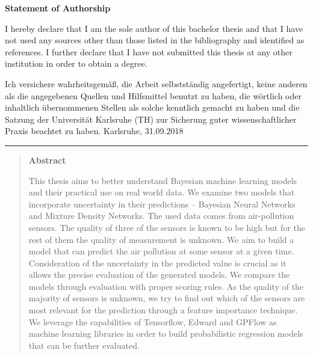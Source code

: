 \documentclass[12pt,a4paper,twoside]{scrartcl}
\numberwithin{equation}{section}
\begin{document}
% 




\centerline{\bf Statement of Authorship}
\vfill

I hereby declare that I am the sole author of this bachelor thesis and that I have not used any sources other than those listed in the bibliography and identified as references. I further declare that I have not submitted this thesis at any other institution in order to obtain a degree.

\vfill
\noindent

\vfill
Ich versichere wahrheitsgemäß, die Arbeit selbstständig angefertigt, keine anderen als die angegebenen Quellen und Hilfsmittel benutzt zu haben, die wörtlich oder inhaltlich übernommenen Stellen als solche kenntlich gemacht zu haben und die Satzung der Universität Karlsruhe (TH) zur Sicherung guter wissenschaftlicher Praxis beachtet zu haben.
\vfill
\noindent
Karlsruhe, 31.09.2018
\hrule


\vspace*{5cm}

\clearpage


\vspace*{0pt}\vfill


\begin{abstract}
  \centerline{\bf Abstract}
  This thesis aims to better understand Bayesian machine learning models and their practical use on real world data. We examine two models that incorporate uncertainty in their predictions -- Bayesian Neural Networks and Mixture Density Networks. The used data comes from air-pollution sensors. The quality of three of the sensors is known to be high but for the rest of them the quality of measurement is unknown. We aim to build a model that can predict the air pollution at some sensor at a given time. Consideration of the uncertainty in the predicted value is crucial as it allows the precise evaluation of the generated models. We compare the models through evaluation with proper scoring rules. As the quality of the majority of sensors is unknown, we try to find out which of the sensors are most relevant for the prediction through a feature importance technique. We leverage the capabilities of Tensorflow, Edward and GPFlow as machine learning libraries in order to build probabilistic regression models that can be further evaluated.
\end{abstract}
\end{document}
